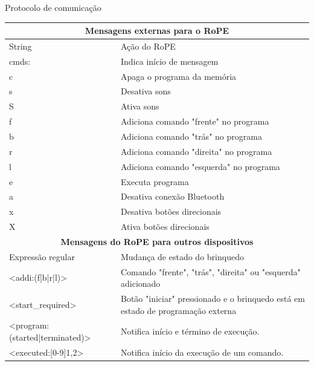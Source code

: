 {\renewcommand{\arraystretch}{1.3}
\begin{quadro}
    \caption{Protocolo de comunicação}
    \label{quadro:protocol}
    \begin{centering}
    \begin{tabular}{|p{}|p{}|}
        \hline
        \multicolumn{2}{|c|}{\textbf{Mensagens externas para o RoPE}} \\ \hline
        String           & Ação do RoPE                                \\ \hline
        cmds:            & Indica início de mensagem \\ \hline
        c                & Apaga o programa da memória \\ \hline
        s                & Desativa sons \\ \hline
        S                & Ativa sons \\ \hline
        f                & Adiciona comando "frente" no programa \\ \hline
        b                & Adiciona comando "trás" no programa \\ \hline
        r                & Adiciona comando "direita" no programa \\ \hline
        l                & Adiciona comando "esquerda" no programa \\ \hline
        e                & Executa programa \\ \hline
        a                & Desativa conexão Bluetooth \\ \hline
        x                & Desativa botões direcionais \\ \hline
        X                & Ativa botões direcionais \\ \hline
        \multicolumn{2}{|c|}{\textbf{Mensagens do RoPE para outros dispositivos}} \\ \hline
        Expressão regular & Mudança de estado do brinquedo \\ \hline
        <addi:(f|b|r|l)>  & Comando "frente", "trás", "direita" ou "esquerda" adicionado \\ \hline
        <start\_required>  & Botão "iniciar" pressionado e o brinquedo está em estado de programação externa \\ \hline
        <program:(started|terminated)>  & Notifica início e término de execução. \\ \hline
        <executed:[0-9]{1,2}>  & Notifica início da execução de um comando. \\ \hline
    \end{tabular}
    \end{centering}
    \sourceauthor
\end{quadro}
}

